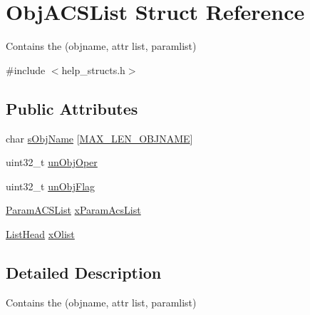\hypertarget{structObjACSList}{\section{Obj\-A\-C\-S\-List Struct Reference}
\label{structObjACSList}
}


Contains the (objname, attr list, paramlist)  




{\ttfamily \#include $<$help\-\_\-structs.\-h$>$}

\subsection*{Public Attributes}
\begin{DoxyCompactItemize}
\item 
char \hyperlink{structObjACSList_a5a1925a2876def6021fd40ee97408e9a}{s\-Obj\-Name} \mbox{[}\hyperlink{group__LIBHELP_ga635a84c0e3ae6e922f824064a006500d}{M\-A\-X\-\_\-\-L\-E\-N\-\_\-\-O\-B\-J\-N\-A\-M\-E}\mbox{]}
\item 
uint32\-\_\-t \hyperlink{structObjACSList_a16665051fe33c9451c7c5a1dc30c5ec6}{un\-Obj\-Oper}
\item 
uint32\-\_\-t \hyperlink{structObjACSList_a20243515414dc476a03d3b437b54cb58}{un\-Obj\-Flag}
\item 
\hyperlink{structParamACSList}{Param\-A\-C\-S\-List} \hyperlink{structObjACSList_acb11fa2a0af21d974914dae699be33a0}{x\-Param\-Acs\-List}
\item 
\hyperlink{group__LIBHELP_ga73f73d414f252ff46652f16495641187}{List\-Head} \hyperlink{structObjACSList_a24b267f9dc8ae7bc18775991d5391c05}{x\-Olist}
\end{DoxyCompactItemize}


\subsection{Detailed Description}
Contains the (objname, attr list, paramlist) 

